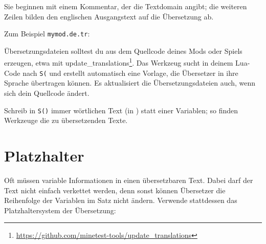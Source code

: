 Sie beginnen mit einem Kommentar, der die Textdomain angibt; die
weiteren Zeilen bilden den englischen Ausgangstext auf die Übersetzung
ab.

Zum Beispiel \texttt{mymod.\allowbreak{}de.\allowbreak{}tr}:

\begin{Shaded}
\begin{Highlighting}[]
\end{Highlighting}
\end{Shaded}

Übersetzungsdateien solltest du aus dem Quellcode deines Mods oder
Spiels erzeugen, etwa mit update\_translations\footnote{\url{https://github.com/minetest-tools/update_translations}}.
Das Werkzeug sucht in deinem Lua-Code nach \texttt{S(} und erstellt
automatisch eine Vorlage, die Übersetzer in ihre Sprache übertragen
können. Es aktualisiert die Übersetzungsdateien auch, wenn sich dein
Quellcode ändert.

Schreib in \texttt{S()} immer wörtlichen Text (in
\texttt{\textquotedbl{}}) statt einer Variablen; so finden Werkzeuge die
zu übersetzenden Texte.

\section{Platzhalter}\label{platzhalter}

Oft müssen variable Informationen in einen übersetzbaren Text. Dabei
darf der Text nicht einfach verkettet werden, denn sonst können
Übersetzer die Reihenfolge der Variablen im Satz nicht ändern. Verwende
stattdessen das Platzhaltersystem der Übersetzung:

\begin{Shaded}
\begin{Highlighting}[]
\OperatorTok{(}\OperatorTok{(}\OperatorTok{)}
    \OperatorTok{(}
\OperatorTok{(}
            \OperatorTok{,}
            \OperatorTok{:}\OperatorTok{()}
        \OperatorTok{)}
    \OperatorTok{)}
\OperatorTok{)}
\end{Highlighting}
\end{Shaded}

